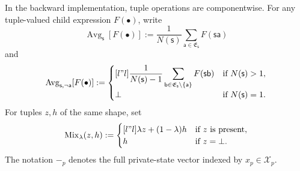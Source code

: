 \documentclass[12pt, a4paper]{article}
\begin{document}
In the backward implementation, tuple operations are componentwise.
For any tuple-valued child expression $F(\bullet)$, write
\[
  \operatorname{Avg}_{\mathsf{s}}[F(\bullet)]
  :=
  \frac{1}{N(\mathsf{s})}\sum_{\mathsf{a}\in\mathfrak{E}_{\mathsf{s}}}F(\mathsf{s}\mathsf{a})
\]
and
\[
  \operatorname{Avg}_{\mathsf{s},\neg\mathsf{a}}[F(\bullet)]
  :=
  \begin{cases}[l"l]
    \displaystyle
    \frac{1}{N(\mathsf{s})-1}
    \sum_{\mathsf{b}\in\mathfrak{E}_{\mathsf{s}}\setminus\{\mathsf{a}\}}F(\mathsf{s}\mathsf{b})
    & \textnormal{if }N(\mathsf{s})>1,\\
    \bot & \textnormal{if }N(\mathsf{s})=1.
  \end{cases}
\]
For tuples $z,h$ of the same shape, set
\[
  \operatorname{Mix}_{\lambda}(z,h)
  :=
  \begin{cases}[l"l]
    \lambda z+(1-\lambda)h & \textnormal{if }z\textnormal{ is present},\\
    h & \textnormal{if }z=\bot.
  \end{cases}
\]
The notation $-_p$ denotes the full private-state vector indexed by $x_p\in\mathcal X_p$.
\end{document}
